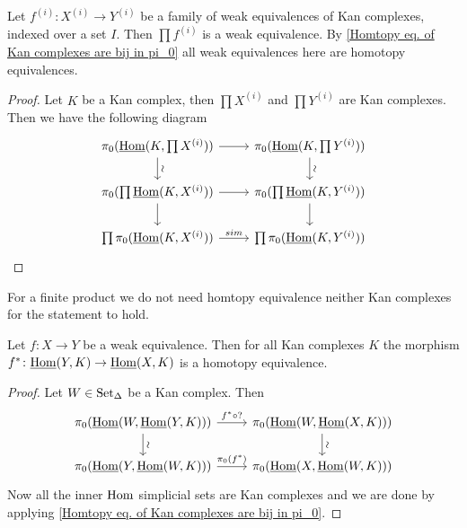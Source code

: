 \begin{prop}
    Let $f^{(i)}\colon X^{(i)} \to Y^{(i)}$ be a family of weak equivalences of Kan complexes, indexed over a set $I$.
    Then $\prod f^{(i)}$ is a weak equivalence.
    By \cref{Homtopy eq. of Kan complexes are bij in pi_0} all weak equivalences here are homotopy equivalences.
\end{prop}

\begin{proof}
    Let $K$ be a Kan complex, then $\prod X^{(i)}$ and $\prod Y^{(i)}$ are Kan complexes.
    Then we have the following diagram
    \[
    \begin{tikzcd}
        \pi_0(\underline{\Hom}(K, \prod X^{(i)}))
        \rar
        \ar[d,sloped, auto= false, "\sim"]
        &
        \pi_0(\underline{\Hom}(K, \prod Y^{(i)}))
        \ar[d,sloped, auto= false, "\sim"]
        \\
        \pi_0(\prod \underline{\Hom}(K, X^{(i)}))
        \rar
        \dar
        &
        \pi_0(\prod \underline{\Hom}(K, Y^{(i)}))
        \dar
        \\
        \prod \pi_0(\underline{\Hom}(K, X^{(i)}))
        \ar[r, "sim"]
        &
        \prod \pi_0(\underline{\Hom}(K, Y^{(i)}))
    \end{tikzcd}
    \]
\end{proof}

\begin{rmk}
    For a finite product we do not need homtopy equivalence neither Kan complexes for the statement to hold.
\end{rmk}

\begin{prop}
    Let $f\colon X \to Y$ be a weak equivalence.
    Then for all Kan complexes $K$ the morphism $f^*\colon \underline{\operatorname{Hom}}(Y,K) \to \underline{\operatorname{Hom}}(X,K)$ is a homotopy equivalence.
\end{prop}

\begin{proof}
    Let $ W \in \operatorname{Set}_{\Delta}$ be a Kan complex.
    Then
    \[
    \begin{tikzcd}
        \pi_0(\underline{\Hom}(W, \underline{\Hom}(Y,K)))
        \ar[r, "f^* \circ ?"]
        \ar[d,sloped, auto= false, "\sim"]
        &
        \pi_0(\underline{\Hom}(W, \underline{\Hom}(X,K)))
        \ar[d,sloped, auto= false, "\sim"]
        \\
        \pi_0(\underline{\Hom}(Y, \underline{\Hom}(W,K)))
        \ar[r, "\pi_0(f^*)"]
        &
        \pi_0(\underline{\Hom}(X, \underline{\Hom}(W,K)))
    \end{tikzcd}
    \]
    Now all the inner $\operatorname{Hom}$ simplicial sets are Kan complexes and we are done by applying \cref{Homtopy eq. of Kan complexes are bij in pi_0}.
\end{proof}

